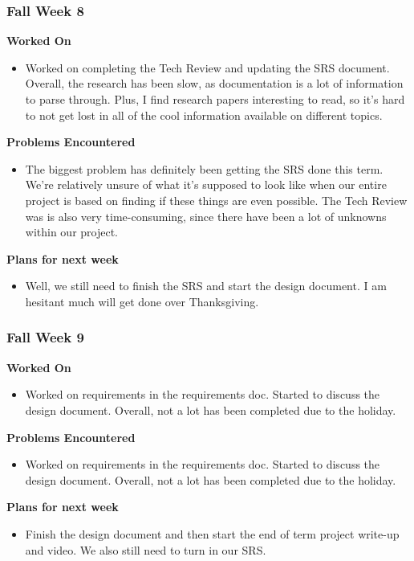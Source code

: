 \documentclass[compsoc,draftclsnofoot,onecolumn,10pt]{IEEEtran}
\begin{document}
\subsubsection*{Fall Week 8}
\textbf{Worked On}
\begin{itemize}
    \item Worked on completing the Tech Review and updating the SRS document. Overall, the research has been slow, as documentation is a lot of information to parse through. Plus, I find research papers interesting to read, so it's hard to not get lost in all of the cool information available on different topics.
\end{itemize}
\textbf{Problems Encountered}
\begin{itemize}
    \item The biggest problem has definitely been getting the SRS done this term. We're relatively unsure of what it's supposed to look like when our entire project is based on finding if these things are even possible. The Tech Review was is also very time-consuming, since there have been a lot of unknowns within our project.
\end{itemize}
\textbf{Plans for next week}
\begin{itemize}
    \item Well, we still need to finish the SRS and start the design document. I am hesitant much will get done over Thanksgiving.
\end{itemize}


\subsubsection*{Fall Week 9}
\textbf{Worked On}
\begin{itemize}
    \item Worked on requirements in the requirements doc. Started to discuss the design document. Overall, not a lot has been completed due to the holiday.
\end{itemize}
\textbf{Problems Encountered}
\begin{itemize}
    \item Worked on requirements in the requirements doc. Started to discuss the design document. Overall, not a lot has been completed due to the holiday.
\end{itemize}
\textbf{Plans for next week}
\begin{itemize}
    \item Finish the design document and then start the end of term project write-up and video. We also still need to turn in our SRS.
\end{itemize}
\end{document}
